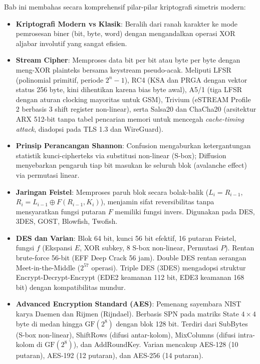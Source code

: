 \documentclass[main.tex]{subfiles}
\begin{document}

\begin{rangkuman}
Bab ini membahas secara komprehensif pilar-pilar kriptografi simetris modern:
\begin{itemize}
  \item \textbf{Kriptografi Modern vs Klasik}: Beralih dari ranah karakter ke mode pemrosesan biner (bit, byte, word) dengan mengandalkan operasi XOR aljabar involutif yang sangat efisien.
  \item \textbf{Stream Cipher}: Memproses data bit per bit atau byte per byte dengan meng-XOR plainteks bersama keystream pseudo-acak. Meliputi LFSR (polinomial primitif, periode $2^n-1$), RC4 (KSA dan PRGA dengan vektor status 256 byte, kini dihentikan karena bias byte awal), A5/1 (tiga LFSR dengan aturan clocking mayoritas untuk GSM), Trivium (eSTREAM Profile 2 berbasis 3 shift register non-linear), serta Salsa20 dan ChaCha20 (arsitektur ARX 512-bit tanpa tabel pencarian memori untuk mencegah \textit{cache-timing attack}, diadopsi pada TLS 1.3 dan WireGuard).
  \item \textbf{Prinsip Perancangan Shannon}: Confusion mengaburkan ketergantungan statistik kunci-cipherteks via substitusi non-linear (S-box); Diffusion menyebarkan pengaruh tiap bit masukan ke seluruh blok (avalanche effect) via permutasi linear.
  \item \textbf{Jaringan Feistel}: Memproses paruh blok secara bolak-balik ($L_i = R_{i-1}$, $R_i = L_{i-1} \oplus F(R_{i-1}, K_i)$), menjamin sifat reversibilitas tanpa mensyaratkan fungsi putaran $F$ memiliki fungsi invers. Digunakan pada DES, 3DES, GOST, Blowfish, Twofish.
  \item \textbf{DES dan Varian}: Blok 64 bit, kunci 56 bit efektif, 16 putaran Feistel, fungsi $f$ (Ekspansi $E$, XOR subkey, 8 S-box non-linear, Permutasi $P$). Rentan brute-force 56-bit (EFF Deep Crack 56 jam). Double DES rentan serangan Meet-in-the-Middle ($2^{57}$ operasi). Triple DES (3DES) mengadopsi struktur Encrypt-Decrypt-Encrypt (EDE2 keamanan 112 bit, EDE3 keamanan 168 bit) dengan kompatibilitas mundur.
  \item \textbf{Advanced Encryption Standard (AES)}: Pemenang sayembara NIST karya Daemen dan Rijmen (Rijndael). Berbasis SPN pada matriks State $4 \times 4$ byte di medan hingga $\mathrm{GF}(2^8)$ dengan blok 128 bit. Terdiri dari SubBytes (S-box non-linear), ShiftRows (difusi antar-kolom), MixColumns (difusi intra-kolom di $\mathrm{GF}(2^8)$), dan AddRoundKey. Varian mencakup AES-128 (10 putaran), AES-192 (12 putaran), dan AES-256 (14 putaran).

\end{itemize}
\end{rangkuman}
\end{document}
